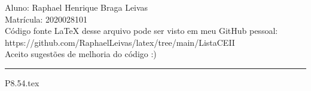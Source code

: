 \documentclass[12pt]{scrartcl}
\begin{document}
\pagestyle{fancy}

\fancyhead{}
\fancyfoot{}

\begin{center}
    Aluno: Raphael Henrique Braga Leivas \\
    Matrícula: 2020028101 \\[20pt]
    Código fonte LaTeX desse arquivo pode ser visto em meu GitHub pessoal: \\
    https://github.com/RaphaelLeivas/latex/tree/main/ListaCEII \\[10pt]
    Aceito sugestões de melhoria do código :)
\end{center}

\hrule

{P8.54.tex}



\end{document}
